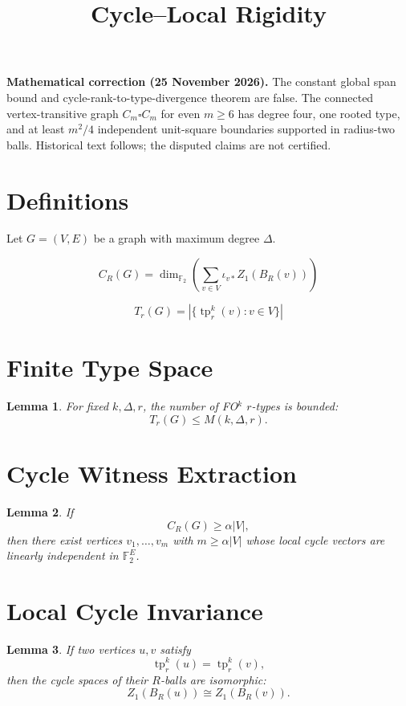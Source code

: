 \documentclass{article}
\newtheorem{lemma}{Lemma}
\begin{document}
\title{Cycle--Local Rigidity}
\date{}
\maketitle
\par\noindent\textbf{Mathematical correction (25 November 2026).} The constant global span bound and cycle-rank-to-type-divergence theorem are false. The connected vertex-transitive graph $C_m\square C_m$ for even $m\ge6$ has degree four, one rooted type, and at least $m^2/4$ independent unit-square boundaries supported in radius-two balls. Historical text follows; the disputed claims are not certified.\par


\section*{Definitions}

Let $G=(V,E)$ be a graph with maximum degree $\Delta$.

\[
C_R(G)=
\dim_{\mathbb F_2}
\left(
\sum_{v\in V}
\iota_{v*} Z_1(B_R(v))
\right)
\]

\[
T_r(G)=
\left|
\{
\operatorname{tp}^{k}_r(v): v\in V
\}
\right|
\]

\section*{Finite Type Space}

\begin{lemma}
For fixed $k,\Delta,r$, the number of FO$^k$ $r$-types is bounded:
\[
T_r(G) \le M(k,\Delta,r).
\]
\end{lemma}

\section*{Cycle Witness Extraction}

\begin{lemma}
If
\[
C_R(G) \ge \alpha |V|,
\]
then there exist vertices $v_1,\dots,v_m$ with $m\ge\alpha|V|$ whose
local cycle vectors are linearly independent in $\mathbb F_2^E$.
\end{lemma}

\section*{Local Cycle Invariance}

\begin{lemma}
If two vertices $u,v$ satisfy
\[
\operatorname{tp}^{k}_r(u)=\operatorname{tp}^{k}_r(v),
\]
then the cycle spaces of their $R$-balls are isomorphic:
\[
Z_1(B_R(u)) \cong Z_1(B_R(v)).
\]
\end{lemma}
\end{document}
